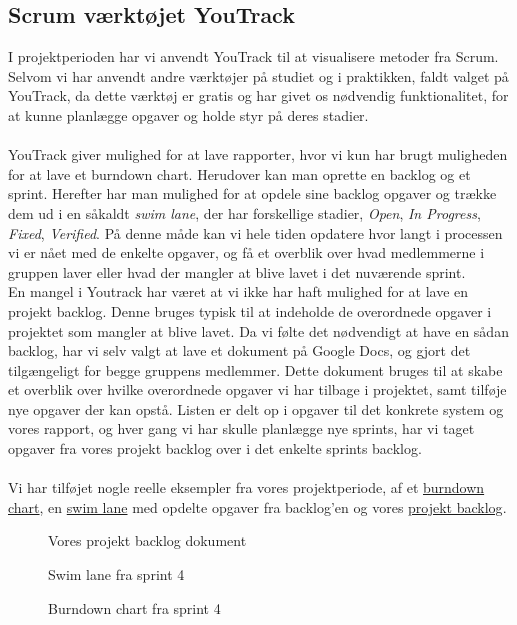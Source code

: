 \subsection{Scrum værktøjet YouTrack}
I projektperioden har vi anvendt YouTrack til at visualisere metoder fra Scrum.
\\
Selvom vi har anvendt andre værktøjer på studiet og i praktikken, faldt valget på YouTrack, da dette værktøj er gratis og
har givet os nødvendig funktionalitet, for at kunne planlægge opgaver og holde styr på deres stadier.
\\\\
YouTrack giver mulighed for at lave rapporter, hvor vi kun har brugt muligheden for at lave et burndown chart. Herudover kan man oprette
en backlog og et sprint. Herefter har man mulighed for at opdele sine backlog opgaver og trække dem ud i en såkaldt \textit{swim lane}, der har forskellige
stadier, \textit{Open}, \textit{In Progress}, \textit{Fixed}, \textit{Verified}. På denne måde kan vi hele tiden opdatere hvor langt i processen vi er nået
med de enkelte opgaver, og få et overblik over hvad medlemmerne i gruppen laver eller hvad der mangler at blive lavet i det nuværende sprint.
\\
En mangel i Youtrack har været at vi ikke har haft mulighed for at lave en projekt backlog. Denne bruges typisk til at indeholde de overordnede opgaver i
projektet som mangler at blive lavet. Da vi følte det nødvendigt at have en sådan backlog, har vi selv valgt at lave et dokument på Google Docs, og gjort det tilgængeligt
for begge gruppens medlemmer. Dette dokument bruges til at skabe et overblik over hvilke overordnede opgaver vi har tilbage i projektet, samt tilføje nye opgaver der kan opstå.
Listen er delt op i opgaver til det konkrete system og vores rapport, og hver gang vi har skulle planlægge nye sprints, har vi taget opgaver fra vores projekt backlog over i
det enkelte sprints backlog.
\\\\
Vi har tilføjet nogle reelle eksempler fra vores projektperiode, af et \hyperref[fig:burndown-chart]{burndown chart}, en \hyperref[fig:swim-lane]{swim lane} med opdelte opgaver fra backlog'en og vores \hyperref[fig:projekt-backlog]{projekt backlog}.
\begin{figure}[H]
    \caption{Vores projekt backlog dokument}
    \label{fig:projekt-backlog}
\end{figure}
\begin{figure}[H]
    \caption{Swim lane fra sprint 4}
    \label{fig:swim-lane}
\end{figure}
\begin{figure}[H]
    \caption{Burndown chart fra sprint 4}
    \label{fig:burndown-chart}
\end{figure}
